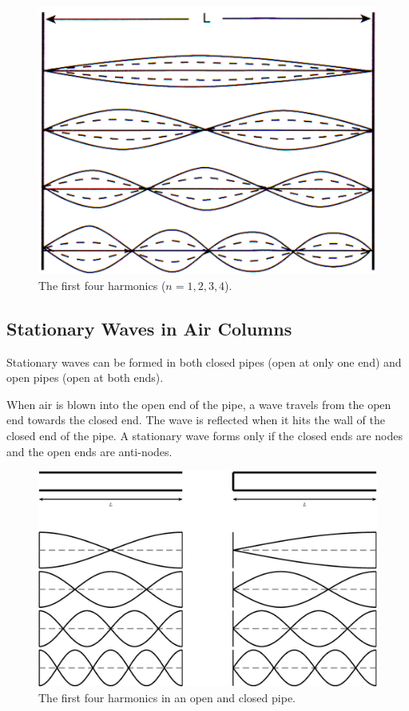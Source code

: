 \begin{figure}[H]
    \centering
    \includegraphics[scale=0.4]{media/Harmonics in a String.png}
    \caption{The first four harmonics ($n = 1, 2, 3, 4$).\protect\footnotemark}
\end{figure}

\subsection{Stationary Waves in Air Columns}

Stationary waves can be formed in both closed pipes (open at only one end) and open pipes (open at both ends).

When air is blown into the open end of the pipe, a wave travels from the open end towards the closed end. The wave is reflected when it hits the wall of the closed end of the pipe. A stationary wave forms only if the closed ends are nodes and the open ends are anti-nodes.

\begin{figure}[H]
    \centering
    \includegraphics[scale=0.7]{media/Harmonics in a Pipe.png}
    \caption{The first four harmonics in an open and closed pipe.\protect\footnotemark}
\end{figure}


